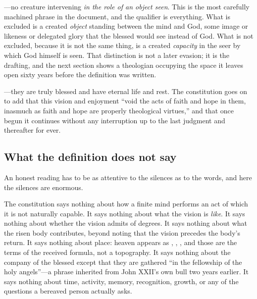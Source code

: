 \emph{}---no creature intervening \emph{in the role of an object seen}. This is the most carefully machined phrase in the document, and the qualifier is everything. What is excluded is a created \emph{object} standing between the mind and God, some image or likeness or delegated glory that the blessed would see instead of God. What is not excluded, because it is not the same thing, is a created \emph{capacity} in the seer by which God himself is seen. That distinction is not a later evasion; it is the drafting, and the next section shows a theologian occupying the space it leaves open sixty years before the definition was written.

\emph{}---they are truly blessed and have eternal life and rest. The constitution goes on to add that this vision and enjoyment ``void the acts of faith and hope in them, inasmuch as faith and hope are properly theological virtues,'' and that once begun it continues without any interruption up to the last judgment and thereafter for ever.

\subsection{What the definition does not say}

An honest reading has to be as attentive to the silences as to the words, and here the silences are enormous.

The constitution says nothing about how a finite mind performs an act of which it is not naturally capable. It says nothing about what the vision is \emph{like}. It says nothing about whether the vision admits of degrees. It says nothing about what the risen body contributes, beyond noting that the vision precedes the body's return. It says nothing about place: heaven appears as , , , and those are the terms of the received formula, not a topography. It says nothing about the company of the blessed except that they are gathered ``in the fellowship of the holy angels''---a phrase inherited from John XXII's own bull two years earlier. It says nothing about time, activity, memory, recognition, growth, or any of the questions a bereaved person actually asks.

